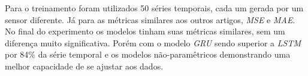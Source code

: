 Para o treinamento foram utilizados 50 séries temporais, cada um gerada por um sensor diferente. Já para as métricas similares aos outros artigos, \textit{\acrshort{MSE}} e \textit{\acrshort{MAE}}. No final do experimento os modelos tinham suas métricas similares, sem um diferença muito significativa. Porém com o modelo \textit{\acrshort{GRU}} sendo superior a \textit{\acrshort{LSTM}} por 84\% da série temporal e os modelos não-paramêtricos demonstrando uma melhor capacidade de se ajustar aos dados.
